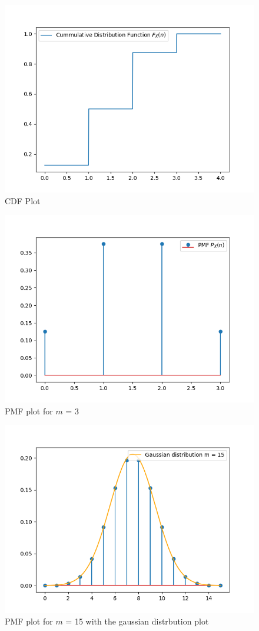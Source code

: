 \documentclass[journal]{IEEEtran}
\begin{document}
\begin{figure}[h!]
  \centering
  \includegraphics[width=0.7\columnwidth]{figs/cdf.png}
  \caption{CDF Plot}
  \label{label}
\end{figure}

\begin{figure}[h!]
  \centering
  \includegraphics[width=0.7\columnwidth]{figs/pmf1.png}
  \caption{PMF plot for $m$ = 3}
  \label{label}
\end{figure}

\begin{figure}[h!]
  \centering
  \includegraphics[width=0.7\columnwidth]{figs/pmf2.png}
  \caption{PMF plot for $m$ = 15 with the gaussian distrbution plot}
  \label{label}
\end{figure}
\end{document}
